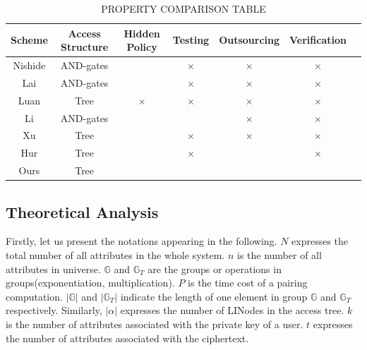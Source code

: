 \documentclass[smallextended]{svjour3}       %
\begin{document}
\begin{table}[htbp] 
	\caption{PROPERTY COMPARISON TABLE}
	\resizebox{\textwidth}{12mm}
	{
		\begin{tabular}{|c|c|c|c|c|c|c|}
		\hline
		\textbf{Scheme} & \textbf{Access Structure} & \textbf{Hidden Policy} & \textbf{Testing} & \textbf{Outsourcing} & \textbf{Verification} \\
		\hline 
		Nishide & AND-gates & \checkmark & $\times$   & $\times$   & $\times$    \\ \hline
		Lai     & AND-gates & \checkmark & $\times$   & $\times$   & $\times$    \\ \hline
		Luan    & Tree 		& $\times$   & $\times$   & $\times$   & $\times$    \\ \hline
		Li		& AND-gates & \checkmark & \checkmark & $\times$   & $\times$    \\ \hline
		Xu		& Tree		& \checkmark & $\times$   & $\times$   & $\times$    \\ \hline	
		Hur		& Tree		& \checkmark & $\times$   & \checkmark & $\times$    \\ \hline
		Ours    & Tree 		& \checkmark & \checkmark & \checkmark & \checkmark  \\ \hline
		\end{tabular}
	}
	\label{propertyTable}
\end{table}


\subsection{Theoretical Analysis}
Firstly, let us present the notations appearing in the following. 
$N$ expresses the total number of all attributes in the whole system.
$n$ is the number of all attributes in universe.
$\mathbb{G}$ and $\mathbb{G}_T$ are the groups or operations in groups(exponentiation, multiplication). 
$P$ is the time cost of a pairing computation.
$|\mathbb{G}|$ and $|\mathbb{G}_T|$ indicate the length of one element in group $\mathbb{G}$ and $\mathbb{G}_T$ respectively.
Similarly, $|\alpha|$ expresses the number of LINodes in the access tree.
$k$ is the number of attributes associated with the private key of a user.
$t$ expresses the number of attributes associated with the ciphertext.
\end{document}
